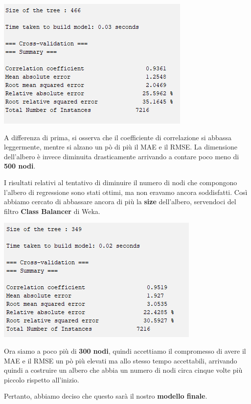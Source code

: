 \documentclass[a4paper, 11pt, oneside]{report}
\begin{document}
                \begin{center}
                    \includegraphics[scale=0.85]{metricheMinNum10}
                \end{center}
                \par \noindent A differenza di prima, si osserva che il coefficiente di correlazione si abbassa leggermente,
                mentre si alzano un pò di più il MAE e il RMSE.
                La dimensione dell'albero è invece diminuita drasticamente arrivando a contare poco meno di \textbf{500 nodi}.
                \\
                \par \noindent I risultati relativi al tentativo di diminuire il numero di nodi che compongono l'albero di
                regressione sono stati ottimi, ma non eravamo ancora soddisfatti.
                Così abbiamo cercato di abbassare ancora di più la \textbf{size} dell'albero, servendoci del
                filtro \textbf{Class Balancer}\label{class:balancer} di Weka.

                \begin{center}
                    \includegraphics[scale=0.85]{metricheDefinitive}
                \end{center}
                \par \noindent Ora siamo a poco più di \textbf{300 nodi}, quindi accettiamo il compromesso di avere il
                MAE e il RMSE un pò più elevati ma allo stesso tempo accettabili,
                arrivando quindi a costruire un albero che abbia un numero di nodi circa cinque volte più piccolo rispetto all'inizio.
                \par \noindent Pertanto, abbiamo deciso che questo sarà il nostro \textbf{modello finale}.
\end{document}
